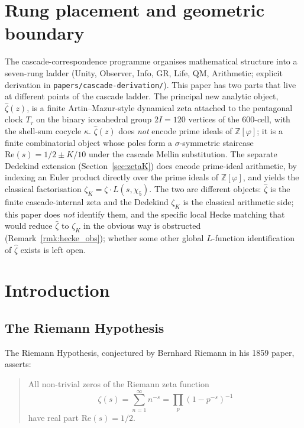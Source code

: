 \documentclass[11pt, a4paper]{amsart}
\theoremstyle{definition}
\begin{document}
\tableofcontents

\section*{Rung placement and geometric boundary}

The cascade-correspondence programme organises mathematical
structure into a seven-rung ladder (Unity, Observer, Info, GR,
Life, QM, Arithmetic; explicit derivation in
\texttt{papers/cascade-derivation/}). This paper has two parts that live at different points of the
cascade ladder.  The principal new analytic object,
$\widehat\zeta(z)$, is a finite Artin--Mazur-style dynamical zeta
attached to the pentagonal clock $T_\tau$ on the binary
icosahedral group $2I = 120$ vertices of the 600-cell, with the
shell-sum cocycle $\kappa$.  $\widehat\zeta(z)$ does \emph{not}
encode prime ideals of $\mathbb{Z}[\varphi]$; it is a finite
combinatorial object whose poles form a $\sigma$-symmetric
staircase $\mathrm{Re}(s) = 1/2 \pm K/10$ under the cascade
Mellin substitution.  The separate Dedekind extension
(Section~\ref{sec:zetaK}) does encode prime-ideal arithmetic, by
indexing an Euler product directly over the prime ideals of
$\mathbb{Z}[\varphi]$, and yields the classical factorisation
$\zeta_K = \zeta \cdot L(s,\chi_5)$.  The two are different
objects: $\widehat\zeta$ is the finite cascade-internal zeta and
the Dedekind $\zeta_K$ is the classical arithmetic side; this
paper does \emph{not} identify them, and the specific local Hecke
matching that would reduce $\widehat\zeta$ to $\zeta_K$ in the
obvious way is obstructed (Remark~\ref{rmk:hecke_obs});
whether some other global $L$-function identification of
$\widehat\zeta$ exists is left open.

\section{Introduction}

\subsection{The Riemann Hypothesis}

The Riemann Hypothesis, conjectured by Bernhard Riemann in his 1859
paper, asserts:

\begin{quotation}
All non-trivial zeros of the Riemann zeta function
\[
\zeta(s) = \sum_{n=1}^\infty n^{-s} = \prod_p (1 - p^{-s})^{-1}
\]
have real part $\mathrm{Re}(s) = 1/2$.
\end{quotation}
\end{document}
